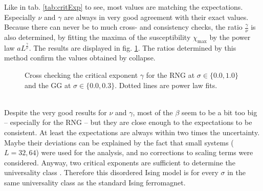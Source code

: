     Like in tab. \ref{tab:critExp} to see, most values
    are matching the expectations. Especially \(\nu\) and \(\gamma\)
    are always in very good agreement with their exact values. Because
    there can never be to much cross- and consistency checks, the ratio
    \(\frac{\gamma}{\nu}\) is also determined, by fitting the maxima of
    the susceptibility \(\chi_{\mathrm{max}}\) by the power law \(aL^\frac{\gamma}{\nu}\).
    The results are displayed in fig. \ref{fig:susCrossCheck}. The ratios
    determined by this method confirm the values obtained by collapse.
    \begin{figure}[htbp]
        \centering
        \caption[Alternative Way Determining $\gamma$]
        {
            Cross checking the critical exponent $\gamma$ for
                 the RNG at $\sigma \in \{0.0, 1.0\}$ and
                 the GG at $\sigma \in \{0.0, 0.3\}$.
            Dotted lines are power law fits.
        }
        \label{fig:susCrossCheck}
    \end{figure}\\
    Despite the very good results for \(\nu\) and \(\gamma\), most of the
    \(\beta\) seem to be a bit too big -- especially for the RNG -- but
    they are close enough to the expectations to be consistent. At least
    the expectations are always within two times the uncertainty.
    Maybe their deviations can be explained by the fact that small
    systems (\(L=32,64\)) were used for the analysis, and no corrections
    to scaling terms were considered.
    Anyway, two critical exponents are sufficient to determine the
    universality class \cite[p. 145]{Katzgraber2011}. Therefore this
    disordered Ising model is for every \(\sigma\) in the same universality
    class as the standard Ising ferromagnet.

